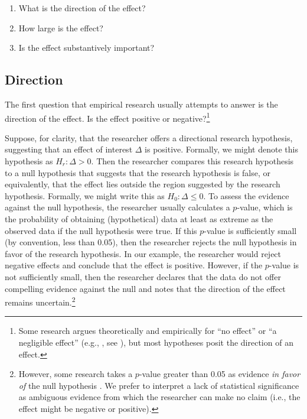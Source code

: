 \documentclass[12pt]{article}
\begin{document}
\begin{enumerate}
\item What is the direction of the effect?
\item How large is the effect?
\item Is the effect substantively important?
\end{enumerate}

\subsection*{Direction}

The first question that empirical research usually attempts to answer is the direction of the effect. Is the effect positive or negative?\footnote{Some research argues theoretically and empirically for ``no effect'' or ``a negligible effect'' (e.g., \citealt{KamPalmer2008}, see \citealt{Rainey2014}), but most hypotheses posit the direction of an effect.} 

Suppose, for clarity, that the researcher offers a directional research hypothesis, suggesting that an effect of interest $\Delta$ is positive. Formally, we might denote this hypothesis as $H_r: \Delta > 0$. Then the researcher compares this research hypothesis to a null hypothesis that suggests that the research hypothesis is false, or equivalently, that the effect lies outside the region suggested by the research hypothesis. Formally, we might write this as $H_0: \Delta \leq 0$. To assess the evidence against the null hypothesis, the researcher usually calculates a $p$-value, which is the probability of obtaining (hypothetical) data at least as extreme as the observed data if the null hypothesis were true. If this $p$-value is sufficiently small (by convention, less than 0.05), then the researcher rejects the null hypothesis in favor of the research hypothesis. In our example, the researcher would reject negative effects and conclude that the effect is positive. However, if the $p$-value is not sufficiently small, then the researcher declares that the data do not offer compelling evidence against the null and notes that the direction of the effect remains uncertain.\footnote{However, some research takes a $p$-value greater than 0.05 as evidence \textit{in favor of} the null hypothesis \citep{Rainey2014}. We prefer to interpret a lack of statistical significance as ambiguous evidence from which the researcher can make no claim (i.e., the effect might be negative or positive).}
\end{document}
